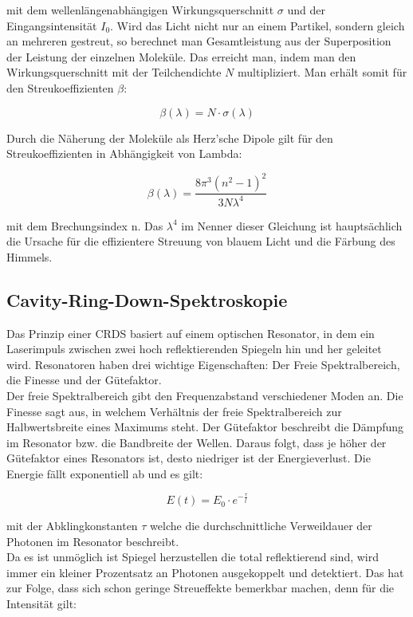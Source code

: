 mit dem wellenlängenabhängigen Wirkungsquerschnitt $\sigma$ und der Eingangsintensität $I_0$. Wird das Licht nicht nur an einem Partikel, sondern gleich an mehreren gestreut, so berechnet man Gesamtleistung aus der Superposition der Leistung der einzelnen Moleküle. Das erreicht man, indem man den Wirkungsquerschnitt mit der Teilchendichte $N$ multipliziert. Man erhält somit für den Streukoeffizienten $\beta$:

\begin{equation}
\beta(\lambda)= N \cdot \sigma(\lambda)
\end{equation}

Durch die Näherung der Moleküle als Herz'sche Dipole gilt für den Streukoeffizienten in Abhängigkeit von Lambda:

\begin{equation}
\beta(\lambda)= \frac{8\pi^3(n^2-1)^2}{3N\lambda^4}
\end{equation}

mit dem Brechungsindex n. Das $\lambda^4$ im Nenner dieser Gleichung ist hauptsächlich die Ursache für die effizientere Streuung von blauem Licht und die Färbung des Himmels. 

\subsection{Cavity-Ring-Down-Spektroskopie}
Das Prinzip einer CRDS basiert auf einem optischen Resonator, in dem ein Laserimpuls zwischen zwei hoch reflektierenden Spiegeln hin und her geleitet wird.
Resonatoren haben drei wichtige Eigenschaften: Der Freie Spektralbereich, die Finesse und der Gütefaktor.\\
Der freie Spektralbereich gibt den Frequenzabstand verschiedener Moden an. Die Finesse sagt aus, in welchem Verhältnis der freie Spektralbereich zur Halbwertsbreite eines Maximums steht. Der Gütefaktor beschreibt die Dämpfung im Resonator bzw. die Bandbreite der Wellen. Daraus folgt, dass je höher der Gütefaktor eines Resonators ist, desto niedriger ist der Energieverlust. Die Energie fällt exponentiell ab und es gilt:

\begin{equation}
E(t) = E_0 \cdot e^{-\frac{\tau}{t}}
\end{equation}

mit der Abklingkonstanten $\tau$ welche die durchschnittliche Verweildauer der Photonen im Resonator beschreibt.\\ 
Da es ist unmöglich ist Spiegel herzustellen die total reflektierend sind, wird immer ein kleiner Prozentsatz an Photonen ausgekoppelt und detektiert. Das hat zur Folge, dass sich schon geringe Streueffekte bemerkbar machen, denn für die Intensität gilt:

